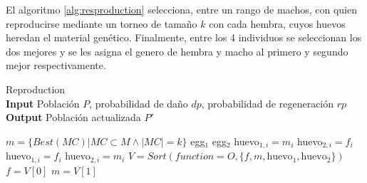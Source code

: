  El algoritmo \ref{alg:resproduction} selecciona, entre un rango de machos, con quien reproducirse mediante un torneo de tamaño $k$ con cada hembra, cuyos huevos heredan el material genético. Finalmente, entre los 4 individuos se seleccionan los dos mejores y se les asigna el genero de hembra y macho al primero y segundo mejor respectivamente.
 
   \begin{algorithm}[H]
 	\caption{Reproduction \\
 		\textbf{Input} Población $P$, probabilidad de daño $dp$, probabilidad de regeneración $rp$ \\
 		\textbf{Output}  Población actualizada $P'$} 
 	\begin{algorithmic}[1]
 			\State $m = \{Best(MC) | MC \subset M \land |MC| = k\}$
 			\State egg$_1$
 			\State egg$_2$
 					\State huevo$_{1,i} = m_i$
 					\State huevo$_{2,i} = f_i$ 
 				\Else
 					\State huevo$_{1,i} = f_i$
 					\State huevo$_{2,i} = m_i$ 
 				\EndIf
 			\EndFor
 		\EndFor
 		\State $V=Sort(function= O, \{ f, m, \text{huevo}_1, \text{huevo}_2 \})$
 		\State $f = V[0]$
 		\State $m = V[1]$
 	\end{algorithmic}
 	\label{alg:resproduction}
 \end{algorithm}
 


 
 